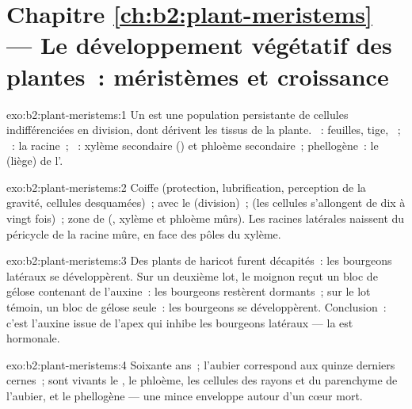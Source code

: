 \section*{Chapitre \ref{ch:b2:plant-meristems} --- Le développement végétatif des plantes~: méristèmes et croissance}

\begin{solution}{exo:b2:plant-meristems:1}
Un  est une population persistante de cellules indifférenciées
en division, dont dérivent les tissus de la plante. ~: feuilles, tige, ~; ~: la
racine~; ~: xylème secondaire () et phloème secondaire~;
phellogène~: le  (liège) de l'.
\end{solution}

\begin{solution}{exo:b2:plant-meristems:2}
Coiffe (protection, lubrification, perception de la gravité, cellules
desquamées)~;  avec le  (division)~;  (les cellules s'allongent de dix à vingt fois)~; zone de
 (, xylème et phloème mûrs). Les racines
latérales naissent du péricycle de la racine mûre, en face des pôles du
xylème.
\end{solution}

\begin{solution}{exo:b2:plant-meristems:3}
Des plants de haricot furent décapités~: les bourgeons latéraux se
développèrent. Sur un deuxième lot, le moignon reçut un bloc de gélose
contenant de l'auxine~: les bourgeons restèrent dormants~; sur le lot
témoin, un bloc de gélose seule~: les bourgeons se développèrent.
Conclusion~: c'est l'auxine issue de l'apex qui inhibe les bourgeons
latéraux --- la  est hormonale.
\end{solution}

\begin{solution}{exo:b2:plant-meristems:4}
Soixante ans~; l'aubier correspond aux quinze derniers cernes~; sont
vivants le , le phloème, les cellules des rayons et du parenchyme
de l'aubier, et le phellogène --- une mince enveloppe autour d'un cœur
mort.
\end{solution}

